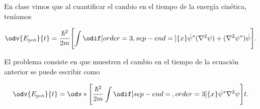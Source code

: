 \documentclass[../main.tex]{subfiles}
\begin{document}
\begin{problema}[10]
	En clase vimos que al cuantificar el cambio en el tiempo de la energía
	cinética, teníamos

	\begin{equation*}
		\odv{E_{\text{pot}}}{t} = \dfrac{\hbar^{2}}{2m}\Biggl[\int \odif[order=3,sep-end=\medspace]{x} \dot{\psi}^{*}(\nabla^{2}{\psi}) + (\nabla^{2}{\psi^{*}})\dot{\psi}\Biggr].
	\end{equation*}

	El problema consiste en que muestren el cambio en el tiempo de la
	ecuación anterior se puede escribir como

	\begin{equation*}
		\odv{E_{\text{pot}}}{t} = \odv*{\Biggl[\dfrac{\hbar^{2}}{2m}\int \odif[sep-end=\medspace, order=3]{x} \dot{\psi}^{*}\nabla^{2}{\psi}\Biggr]}{t}.
	\end{equation*}
\end{problema}
\end{document}
